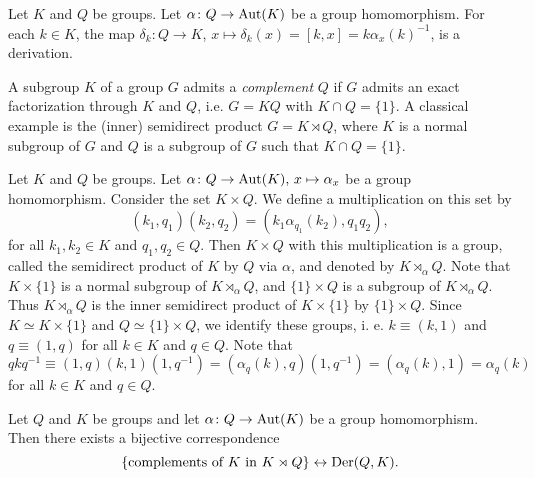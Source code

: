 \begin{example}
	Let $K$ and $Q$ be groups. Let $\alpha\colon Q\rightarrow \operatorname{Aut}(K)$ be a group homomorphism.  For each $k\in K$, the map 
	$\delta_k\colon Q\to K$, $x\mapsto \delta_k(x)=[k,x]=k\alpha_x(k)^{-1}$, is a derivation. 
\end{example}



A subgroup $K$ of a group $G$ admits a {\em complement} $Q$ if $G$ admits an exact factorization 
through $K$ and $Q$, i.e. $G=KQ$ with $K\cap Q=\{1\}$. 
A classical example is the (inner) semidirect product $G=K\rtimes Q$, where $K$ is a normal subgroup of $G$ 
and $Q$ is a subgroup of $G$ such that $K\cap Q=\{1\}$. 

Let $K$ and $Q$ be groups. Let $\alpha\colon Q\rightarrow \operatorname{Aut}(K),\,x\mapsto \alpha_x$ be a group homomorphism. Consider the set $K\times Q$. We define a multiplication on this set by
\[(k_1,q_1)(k_2,q_2)=(k_1\alpha_{q_1}(k_2),q_1q_2),\]
for all $k_1,k_2\in K$ and $q_1,q_2\in Q$. Then $K\times Q$ with this multiplication is a group, called the semidirect product of $K$ by $Q$ via $\alpha$, and denoted by $K\rtimes_{\alpha}Q$. Note that $K\times\{ 1\}$ is a normal subgroup of $K\rtimes_{\alpha}Q$, and $\{1\}\times Q$ is a subgroup of $K\rtimes_{\alpha}Q$. Thus $K\rtimes_{\alpha}Q$ is the inner semidirect product of $K\times\{ 1\}$ by $\{1\}\times Q$. Since $K\simeq K\times\{ 1\}$ and $Q\simeq \{1\}\times Q$, we identify these groups, i. e. $k\equiv (k,1)$ and $q\equiv (1,q)$ for all $k\in K$ and $q\in Q$. Note that
\[ 
qkq^{-1}\equiv (1,q)(k,1)(1,q^{-1})=(\alpha_q(k),q)(1,q^{-1})=(\alpha_q(k),1)=\alpha_q(k)
\]
for all $k\in K$ and $q\in Q$.

\begin{theorem}
	\label{thm:complements}
	Let $Q$ and $K$ be groups and let $\alpha\colon Q\rightarrow \operatorname{Aut} (K)$ be a
	group homomorphism. Then there exists a bijective correspondence
	\[
	\{\text{complements of $K$ in $K\rtimes Q$}\}\leftrightarrow\operatorname{Der}(Q,K).
	\]
\end{theorem}

